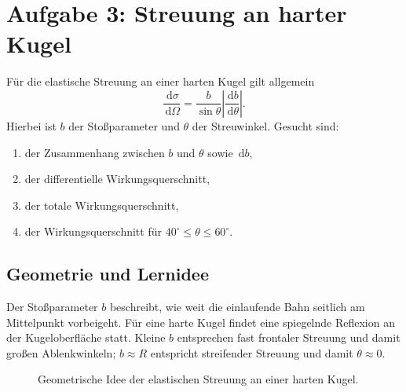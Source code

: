\documentclass[11pt,a4paper]{scrartcl}
\newcommand{\abs}[1]{\left| #1 \right|}
\newcommand{\dd}{\,\mathrm{d}}
\newcommand{\dv}[2]{\frac{\dd #1}{\dd #2}}
\newcommand{\diffxs}{\frac{\dd\sigma}{\dd\Omega}}
\theoremstyle{definition}
\theoremstyle{plain}
\theoremstyle{remark}
\begin{document}
\FloatBarrier
\newpage

\section{Aufgabe 3: Streuung an harter Kugel}

\begin{taskbox}
Für die elastische Streuung an einer harten Kugel gilt allgemein
\[
    \diffxs = \frac{b}{\sin\theta}\abs{\dv{b}{\theta}}.
\]
Hierbei ist $b$ der Stoßparameter und $\theta$ der Streuwinkel. Gesucht sind:
\begin{enumerate}[label=(\alph*)]
    \item der Zusammenhang zwischen $b$ und $\theta$ sowie $\dd b$,
    \item der differentielle Wirkungsquerschnitt,
    \item der totale Wirkungsquerschnitt,
    \item der Wirkungsquerschnitt für $40^\circ\leq\theta\leq60^\circ$.
\end{enumerate}
\end{taskbox}

\subsection{Geometrie und Lernidee}

\begin{learningbox}
Der Stoßparameter $b$ beschreibt, wie weit die einlaufende Bahn seitlich am Mittelpunkt vorbeigeht. Für eine harte Kugel findet eine spiegelnde Reflexion an der Kugeloberfläche statt. Kleine $b$ entsprechen fast frontaler Streuung und damit großen Ablenkwinkeln; $b\approx R$ entspricht streifender Streuung und damit $\theta\approx0$.
\end{learningbox}

\begin{figure}[h]
\centering
{}
\caption{Geometrische Idee der elastischen Streuung an einer harten Kugel.}
\end{figure}
\end{document}
